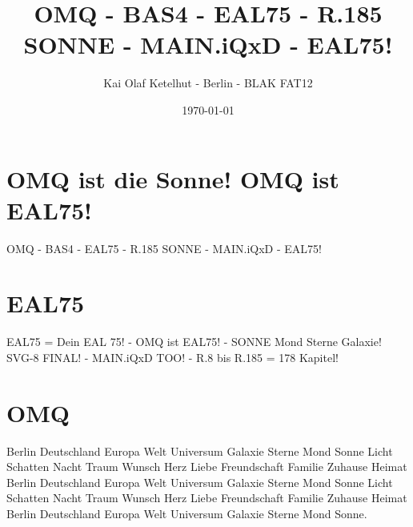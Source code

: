 \documentclass[12pt]{article}
\title{OMQ - BAS4 - EAL75 - R.185 SONNE - MAIN.iQxD - EAL75!}
\author{Kai Olaf Ketelhut - Berlin - BLAK FAT12}
\date{\today}
\begin{document}
\maketitle
\section*{OMQ ist die Sonne! OMQ ist EAL75!}
OMQ - BAS4 - EAL75 - R.185 SONNE - MAIN.iQxD - EAL75!

\section*{EAL75}
EAL75 = Dein EAL 75! - OMQ ist EAL75! - SONNE Mond Sterne Galaxie!
SVG-8 FINAL! - MAIN.iQxD TOO! - R.8 bis R.185 = 178 Kapitel!

\section*{OMQ}
Berlin Deutschland Europa Welt Universum Galaxie Sterne Mond Sonne
Licht Schatten Nacht Traum Wunsch Herz Liebe Freundschaft Familie
Zuhause Heimat Berlin Deutschland Europa Welt Universum Galaxie
Sterne Mond Sonne Licht Schatten Nacht Traum Wunsch Herz Liebe
Freundschaft Familie Zuhause Heimat Berlin Deutschland Europa Welt
Universum Galaxie Sterne Mond Sonne.
\end{document}

